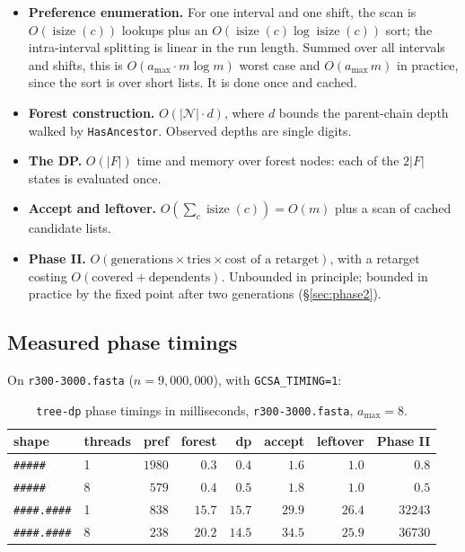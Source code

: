 \documentclass[11pt,a4paper]{article}
\theoremstyle{definition}
\theoremstyle{plain}
\theoremstyle{remark}
\newcommand{\isize}{\operatorname{isize}}
\newcommand{\Names}{\mathcal{N}}
\begin{document}
\begin{itemize}
\item \textbf{Preference enumeration.} For one interval and one shift,
  the scan is $O(\isize(c))$ lookups plus an
  $O(\isize(c) \log \isize(c))$ sort; the intra-interval splitting is
  linear in the run length. Summed over all intervals and shifts, this
  is $O(a_{\max} \cdot m \log m)$ worst case and $O(a_{\max}\, m)$ in
  practice, since the sort is over short lists. It is done once and
  cached.
\item \textbf{Forest construction.} $O(|\Names| \cdot d)$, where $d$
  bounds the parent-chain depth walked by \texttt{HasAncestor}. Observed
  depths are single digits.
\item \textbf{The DP.} $O(|F|)$ time and memory over forest nodes: each
  of the $2|F|$ states is evaluated once.
\item \textbf{Accept and leftover.} $O(\sum_c \isize(c)) = O(m)$ plus a
  scan of cached candidate lists.
\item \textbf{Phase II.} $O(\text{generations} \times \text{tries}
  \times \text{cost of a retarget})$, with a retarget costing
  $O(\text{covered} + \text{dependents})$. Unbounded in principle;
  bounded in practice by the fixed point after two generations
  (\S\ref{sec:phase2}).
\end{itemize}

\subsection{Measured phase timings}

On \texttt{r300-3000.fasta} ($n = 9{,}000{,}000$), with
\texttt{GCSA\_TIMING=1}:

\begin{table}[h]
\centering
\caption{\texttt{tree-dp} phase timings in milliseconds,
  \texttt{r300-3000.fasta}, $a_{\max}=8$.}
\label{tab:timing}
\begin{tabular}{llrrrrrr}
\toprule
shape & threads & pref & forest & dp & accept & leftover & Phase II \\
\midrule
\texttt{\#\#\#\#\#}      & 1 & $1980$ & $0.3$  & $0.4$  & $1.6$  & $1.0$  & $0.8$ \\
\texttt{\#\#\#\#\#}      & 8 & $579$  & $0.4$  & $0.5$  & $1.8$  & $1.0$  & $0.5$ \\
\texttt{\#\#\#\#.\#\#\#\#} & 1 & $838$  & $15.7$ & $15.7$ & $29.9$ & $26.4$ & $32243$ \\
\texttt{\#\#\#\#.\#\#\#\#} & 8 & $238$  & $20.2$ & $14.5$ & $34.5$ & $25.9$ & $36730$ \\
\bottomrule
\end{tabular}
\end{table}
\end{document}
